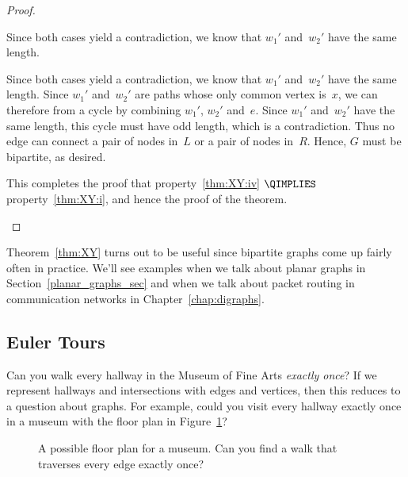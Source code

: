 \begin{editingnotes}
\begin{proof}
\begin{description}
\begin{description}
\end{description}

Since both cases yield a contradiction, we know that $w_1'$ and~$w_2'$
have the same length.

Since both cases yield a contradiction, we know that $w_1'$ and~$w_2'$
have the same length.  Since $w_1'$ and~$w_2'$ are paths whose only
common vertex is~$x$, we can therefore from a cycle by combining
$w_1'$, $w_2'$ and~$e$.  Since $w_1'$ and~$w_2'$ have the same length,
this cycle must have odd length, which is a contradiction.  Thus no
edge can connect a pair of nodes in~$L$ or a pair of nodes in~$R$.
Hence, $G$ must be bipartite, as desired.

This completes the proof that property~\ref{thm:XY:iv} $\QIMPLIES$
property~\ref{thm:XY:i}, and hence the proof of the theorem.  \qedhere

\end{description}

\end{proof}

Theorem~\ref{thm:XY} turns out to be useful since bipartite graphs
come up fairly often in practice.  We'll see examples when we talk
about planar graphs in Section~\ref{planar_graphs_sec} and when we
talk about packet routing in communication networks in
Chapter~\ref{chap:digraphs}.

\end{editingnotes}

\subsection{Euler Tours}

Can you walk every hallway in the Museum of Fine Arts \emph{exactly
  once}?  If we represent hallways and intersections with edges and
vertices, then this reduces to a question about graphs.  For example,
could you visit every hallway exactly once in a museum with the
floor plan in Figure~\ref{fig:5BC}?

\begin{figure}



\caption{A possible floor plan for a museum. Can you find a walk that
  traverses every edge exactly once?}

\label{fig:5BC}

\end{figure}

